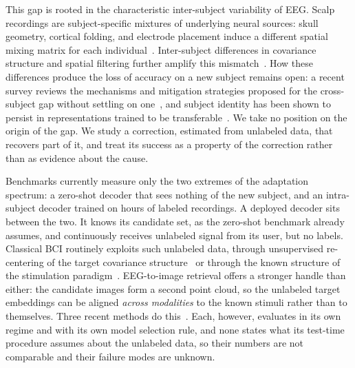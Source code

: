 \documentclass[10pt,twocolumn,letterpaper]{article}
\begin{document}
This gap is rooted in the characteristic inter-subject variability of EEG. Scalp recordings are subject-specific mixtures of underlying neural sources: skull geometry, cortical folding, and electrode placement induce a different spatial mixing matrix for each individual~\cite{onton2006imaging}. Inter-subject differences in covariance structure and spatial filtering further amplify this mismatch~\cite{blankertz2008optimizing,barachant2010riemannian,samek2013transferring,haufe2014interpretation}. How these differences produce the loss of accuracy on a new subject remains open: a recent survey reviews the mechanisms and mitigation strategies proposed for the cross-subject gap without settling on one~\cite{li2026crosssubject}, and subject identity has been shown to persist in representations trained to be transferable~\cite{lin2026identitytrap}. We take no position on the origin of the gap. We study a correction, estimated from unlabeled data, that recovers part of it, and treat its success as a property of the correction rather than as evidence about the cause.

Benchmarks currently measure only the two extremes of the adaptation spectrum: a zero-shot decoder that sees nothing of the new subject, and an intra-subject decoder trained on hours of labeled recordings. A deployed decoder sits between the two. It knows its candidate set, as the zero-shot benchmark already assumes, and continuously receives unlabeled signal from its user, but no labels. Classical BCI routinely exploits such unlabeled data, through unsupervised re-centering of the target covariance structure~\cite{zanini2018transfer,he2020euclidean,rodrigues2019rpa} or through the known structure of the stimulation paradigm~\cite{kindermans2012bayesian,huebner2017learning}. EEG-to-image retrieval offers a stronger handle than either: the candidate images form a second point cloud, so the unlabeled target embeddings can be aligned \emph{across modalities} to the known stimuli rather than to themselves. Three recent methods do this~\cite{huang2026sattc,cui2026score,yadav2026svtl}. Each, however, evaluates in its own regime and with its own model selection rule, and none states what its test-time procedure assumes about the unlabeled data, so their numbers are not comparable and their failure modes are unknown.
\end{document}
